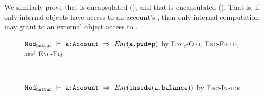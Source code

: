 We similarly prove that  {is encapsulated} (\textbf{}), and
that  {is encapsulated} (\textbf{}). 
That is, if only internal objects have access
to an account's , then only internal computation may grant 
 to an external object access to .

\begin{figure}[h]
\begin{proofexample}
		{\proofstepwithrule
			{
			${\texttt{Mod}}_{{\texttt{better}}}\ \vdash\ {\texttt{a:Account}}\ \Rightarrow\ \textit{Enc}({\texttt{a.pwd=p}})$
			}{by \textsc{Enc$_e$-Obj}, \textsc{Enc-Field}, and \textsc{Enc-Eq}}}
\endproofsteps
\end{proofexample}
\\\begin{proofexample}
		{\proofstepwithrule
			{
			${\texttt{Mod}}_{{\texttt{better}}}\ \vdash\ {\texttt{a:Account}}\ \Rightarrow\ \textit{Enc}(\texttt{inside}( {\texttt{a.balance}} ))$
			}{by \textsc{Enc-Inside}}}
\endproofsteps
\end{proofexample}
\end{figure}

